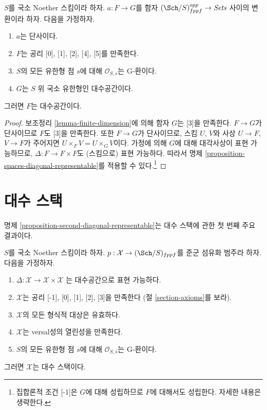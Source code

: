 \begin{lemma}
\label{lemma-monomorphism}
$S$를 국소 Noether 스킴이라 하자. $a : F \to G$를
함자 $(\Sch/S)_{fppf}^{opp} \to \textit{Sets}$ 사이의 변환이라 하자.
다음을 가정하자.
\begin{enumerate}
\item $a$는 단사이다.
\item $F$는 공리 [0], [1], [2], [4], [5]를 만족한다.
\item $S$의 모든 유한형 점 $s$에 대해 $\mathcal{O}_{S, s}$는 G-환이다.
\item $G$는 $S$ 위 국소 유한형인 대수공간이다.
\end{enumerate}
그러면 $F$는 대수공간이다.
\end{lemma}

\begin{proof}
보조정리 \ref{lemma-finite-dimension}에 의해 함자 $G$는 [3]을 만족한다.
$F \to G$가 단사이므로 $F$도 [3]을 만족한다.
또한 $F \to G$가 단사이므로, 스킴 $U$, $V$와 사상 $U \to F$,
$V \to F$가 주어지면 $U \times_F V = U \times_G V$이다.
가정에 의해 $G$에 대해 대각사상이 표현 가능하므로,
$\Delta : F \to F \times F$도 (스킴으로) 표현 가능하다.
따라서 명제 \ref{proposition-spaces-diagonal-representable}를 적용할 수
있다.\footnote{집합론적 조건 [-1]은 $G$에 대해 성립하므로 $F$에
대해서도 성립한다. 자세한 내용은 생략한다.}
\end{proof}












\section{대수 스택}
\label{section-algebraic-stacks}

\noindent
명제 \ref{proposition-second-diagonal-representable}는 대수 스택에 관한
첫 번째 주요 결과이다.

\begin{lemma}
\label{lemma-diagonal-representable}
$S$를 국소 Noether 스킴이라 하자.
$p : \mathcal{X} \to (\Sch/S)_{fppf}$를 준군 섬유화 범주라 하자.
다음을 가정하자.
\begin{enumerate}
\item $\Delta : \mathcal{X} \to \mathcal{X} \times \mathcal{X}$
는 대수공간으로 표현 가능하다.
\item $\mathcal{X}$는 공리 [-1], [0], [1], [2], [3]을 만족한다
(절 \ref{section-axioms}를 보라).
\item $\mathcal{X}$의 모든 형식적 대상은 유효하다.
\item $\mathcal{X}$는 versal성의 열린성을 만족한다.
\item $S$의 모든 유한형 점 $s$에 대해 $\mathcal{O}_{S, s}$는 G-환이다.
\end{enumerate}
그러면 $\mathcal{X}$는 대수 스택이다.
\end{lemma}

